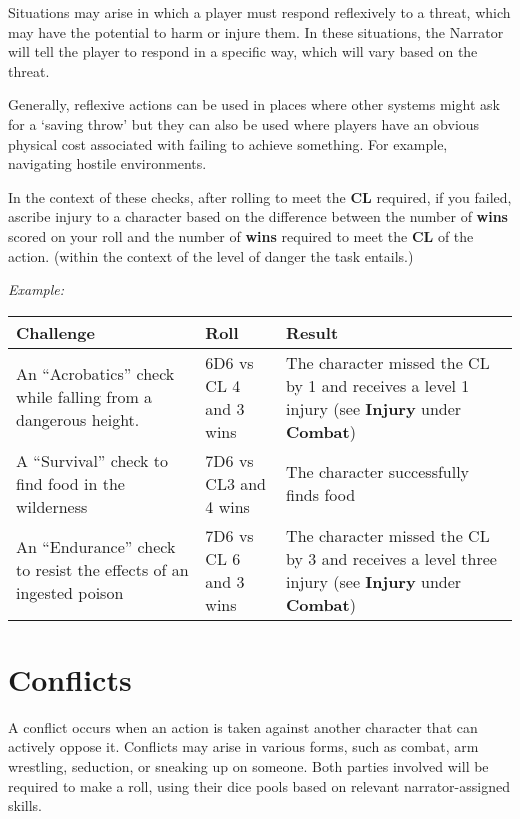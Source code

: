 Situations may arise in which a player must respond reflexively to a threat, which may have the potential to harm or injure them. In these situations, the Narrator will tell the player to respond in a specific way, which will vary based on the threat.

Generally, reflexive actions can be used in places where other systems might ask for a ‘saving throw’ but they can also be used where players have an obvious physical cost associated with failing to achieve something. For example, navigating hostile environments.

In the context of these checks, after rolling to meet the \textbf{CL} required, if you failed, ascribe injury to a character based on the difference between the number of \textbf{wins} scored on your roll and the number of \textbf{wins} required to meet the \textbf{CL} of the action. (within the context of the level of danger the task entails.)

\textit{Example:}

\begin{center}
    \begin{xltabular}{\textwidth}{|X|X|X|} 
        \hline 
        \textbf{Challenge} & \textbf{Roll} & \textbf{Result} \\ 
        \hline
        An “Acrobatics” check while falling from a dangerous height. & 6D6 vs CL 4 and 3 wins & The character missed the CL by 1 and receives a level 1 injury (see \textbf{Injury} under \textbf{Combat}) \\

        A “Survival” check to find food in the wilderness & 7D6 vs CL3 and 4 wins & The character successfully finds food \\

        An “Endurance” check to resist the effects of an ingested poison & 7D6 vs CL 6 and 3 wins & The character missed the CL by 3 and receives a level three injury (see \textbf{Injury} under \textbf{Combat}) \\
        \hline
    \end{xltabular}
\end{center}

\section{Conflicts} \label{sec:conflicts}

A conflict occurs when an action is taken against another character that can actively oppose it. Conflicts may arise in various forms, such as combat, arm wrestling, seduction, or sneaking up on someone. Both parties involved will be required to make a roll, using their dice pools based on relevant narrator-assigned skills.

